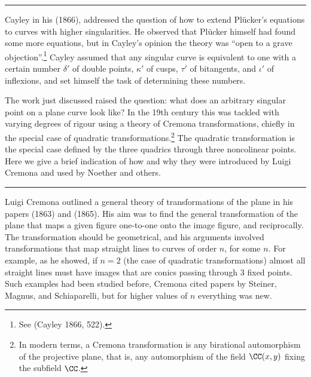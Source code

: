 \bigbreak\hrule\bigbreak

 Cayley in his (1866), addressed the question of how to extend Pl\"ucker's equations to curves with higher singularities.  He observed that Pl\"ucker himself had found some more equations, but in Cayley's opinion the theory was ``open to a grave objection''.\footnote{See  (Cayley 1866,  522).} Cayley assumed that any singular curve is equivalent to one with a certain number $\delta'$ of double points, $\kappa'$ of cusps, $\tau'$ of bitangents, and $\iota'$ of inflexions, and set himself the task of determining these numbers. 

The work just discussed raised the question: what does an arbitrary singular point on a plane curve look like?  In the 19th century this was tackled with varying degrees of rigour using a theory of Cremona transformations, chiefly in the special case of quadratic transformations.\footnote{In modern terms, a Cremona transformation
is any birational automorphism of the projective plane, that is, any automorphism of the field $\CC(x,y)$ fixing the subfield $\CC$.}
The quadratic transformation is the special case defined by the three quadrics through three noncolinear points. Here we give a brief indication of how and why they were introduced by Luigi Cremona and used by Noether and others. 

\bigbreak\hrule\bigbreak


Luigi Cremona outlined a general theory of transformations of the plane in his papers (1863) and (1865). His aim was to find the general transformation of the plane that maps a given figure one-to-one onto the image figure, and reciprocally. The transformation should be geometrical, and his arguments involved transformations that map straight lines to curves of order $n$, for some $n.$  For example, as he showed, if $n=2$ (the case of quadratic transformations) almost all straight lines must have images that are conics passing through 3 fixed points. Such examples had been studied before, Cremona cited papers by Steiner, Magnus, and Schiaparelli, but for higher values of $n$ everything was new.

